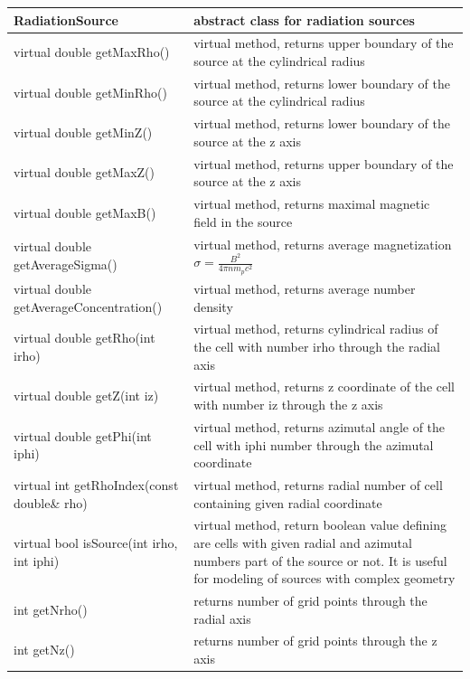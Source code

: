 \begin{small}
	\label{sourceMethods1}
	\begin{xtabular}{|p{0.5\textwidth}|p{0.5\textwidth}|}
		\hline
		\textbf{RadiationSource} & abstract class for radiation sources\\
		\hline
		virtual double getMaxRho() & virtual method, returns upper boundary of the source at the cylindrical radius\\
		\hline
		virtual double getMinRho() & virtual method, returns lower boundary of the source at the cylindrical radius\\
		\hline
		virtual double getMinZ() & virtual method, returns lower boundary of the source at the z axis\\
		\hline
		virtual double getMaxZ() & virtual method, returns upper boundary of the source at the z axis\\
		\hline
		virtual double getMaxB() & virtual method, returns maximal magnetic field in the source\\
		\hline
		virtual double getAverageSigma() & virtual method, returns average magnetization $\sigma=\frac{B^2}{4\pi n m_p c^2}$\\
		\hline
		virtual double getAverageConcentration() & virtual method, returns average number density\\
		\hline
		virtual double getRho(int irho) & virtual method, returns cylindrical radius of the cell with number irho through the radial axis\\
		\hline
		virtual double getZ(int iz)& virtual method, returns z coordinate of the cell with number iz through the z axis\\
		\hline
		virtual double getPhi(int iphi)& virtual method, returns azimutal angle of the cell with iphi number through the azimutal coordinate\\
		\hline
		virtual int getRhoIndex(const double\& rho)& virtual method, returns radial number of cell containing given radial coordinate\\
		\hline
		virtual bool isSource(int irho, int iphi)& virtual method, return boolean value defining are cells with given radial and azimutal numbers part of the source or not. It is useful for modeling of sources with complex geometry \\
		\hline
		int getNrho() & returns number of grid points through the radial axis\\
		\hline
		int getNz() & returns number of grid points through the z axis\\

\end{xtabular}
\end{small}
